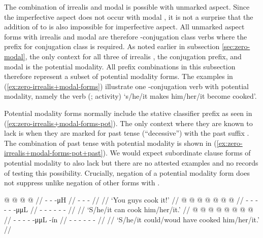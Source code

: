 \begin{multicols}{2}
\noindent
The combination of irrealis  and modal  is possible with unmarked aspect.
Since the imperfective aspect does not occur with modal , it is not a surprise that the addition of  to  is also impossible for imperfective aspect.
All unmarked aspect forms with irrealis  and modal  are therefore -conjugation class verbs where the prefix for conjugation class is required.
As noted earlier in subsection \ref{sec:zero-modal}, the only context for all three of irrealis , the  conjugation prefix, and modal  is the potential modality.
All prefix combinations in this subsection therefore represent a subset of potential modality forms.
The examples in (\ref{ex:zero-irrealis+modal-forms}) illustrate one -conjugation verb with potential modality, namely the verb  (;  activity) ‘s/he/it makes him/her/it become cooked’.

Potential modality forms normally include the stative  classifier prefix as seen in (\ref{ex:zero-irrealis+modal-forms-pot}).
The only context where they are known to lack  is when they are marked for past tense (“decessive”) with the past suffix .
The combination of past tense with potential modality is shown in (\ref{ex:zero-irrealis+modal-forms-pot+past}).
We would expect subordinate clause forms of potential modality to also lack  but there are no attested examples and no records of testing this possibility.
Crucially, negation of a potential modality form does not suppress  unlike negation of other forms with .

\pex\label{ex:zero-irrealis+modal-forms}%
\a\label{ex:zero-irrealis+modal-forms-imp}%
%
\begingl
	\gla	{} @ {} @ {} @ {} @ {} //
	\glb	{} - -  -μH //
	\glc	{}\· - -  - //
	\gld	{} {} {} {} {} //
	\glft	‘You guys cook it!’
		//
\endgl
\a\label{ex:zero-irrealis+modal-forms-pot}%
%
\begingl
	\gla	{} @ {} @ {} @ {} @ {} @ {} @ {} @ {} //
	\glb	{}- -  - - -  -μμL //
	\glc	{}- - \· - - -  - //
	\gld	{} {} {} {} {} {} {} //
	\glft	‘S/he/it can cook him/her/it.’
		//
\endgl
\a\label{ex:zero-irrealis+modal-forms-pot+past}%
%
\begingl
	\gla	{} @ {} @ {} @ {} @ {} @ {} @ {} @ {} @ {} //
	\glb	{}- -  - -   -μμL -ín //
	\glc	{}- - \· - -   - - //
	\gld	{} {} {} {} {} {} {} {} //
	\glft	‘S/he/it could/woud have cooked him/her/it.’
		//
\endgl
\xe
\end{multicols}

